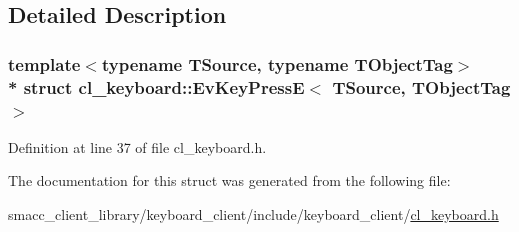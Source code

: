\subsection{Detailed Description}
\subsubsection*{template$<$typename T\+Source, typename T\+Object\+Tag$>$\\*
struct cl\+\_\+keyboard\+::\+Ev\+Key\+Press\+E$<$ T\+Source, T\+Object\+Tag $>$}



Definition at line 37 of file cl\+\_\+keyboard.\+h.



The documentation for this struct was generated from the following file\+:\begin{DoxyCompactItemize}
\item 
smacc\+\_\+client\+\_\+library/keyboard\+\_\+client/include/keyboard\+\_\+client/\hyperlink{cl__keyboard_8h}{cl\+\_\+keyboard.\+h}\end{DoxyCompactItemize}
